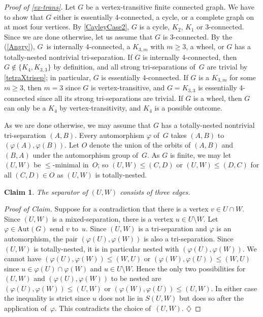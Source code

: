 \documentclass{aic}
\newcommand{\jaf}[3]{#2} %
\newenvironment{cproof}{\noindent\textit{Proof of Claim.}}{\phantom{!}\!\hfill$\diamondsuit$}
\theoremstyle{plain}
\newtheorem{sublem}{Claim}[thm]
\theoremstyle{definition}
\theoremstyle{plain}
\theoremstyle{plain}
\newcommand{\sm}{\setminus}
\renewcommand{\geq}{\geqslant}
\renewcommand{\le}{\leqslant}
\renewcommand{\ge}{\geqslant}
\begin{document}
\begin{proof}[Proof of \autoref{vx-trans}]
Let $G$ be a vertex-transitive finite connected graph.
We have to show that $G$ either is essentially 4-connected, a cycle, or a complete graph on at most four vertices.
By \jaf{\cite[Theorem~3]{infiniteSPQR}}{\autoref{CayleyCase2}}{\autoref{CayleyCase2}}, $G$ is a cycle, $K_2$, $K_1$ or 3-connected. 
Since we are done otherwise, let us assume that $G$ is 3-connected.
By the  (\ref{Angry}), $G$~is internally 4-connected, a $K_{3,m}$ with $m\geq 3$, a wheel, or $G$ has a totally-nested nontrivial tri-separation. 
If $G$ is internally 4-connected, then $G\notin \{K_4,K_{3,3}\}$ by definition, and all strong tri-separations of~$G$ are trivial by \autoref{tetraXtrisep}; in particular, $G$ is essentially 4-connected.
If $G$ is a $K_{3,m}$ for some~$m\ge 3$, then $m=3$ since $G$ is vertex-transitive, and $G=K_{3,3}$ is essentially 4-connected since all its strong tri-separations are trivial.
If $G$ is a wheel, then $G$ can only be a $K_4$ by vertex-transitivity, and $K_4$ is a possible outcome.

As we are done otherwise, we may assume that $G$ has a totally-nested nontrivial tri-separation $(A,B)$.
Every automorphism $\varphi$ of~$G$ takes $(A,B)$ to~$(\varphi(A),\varphi(B))$.
Let $O$ denote the union of the orbits of $(A,B)$ and $(B,A)$ under the automorphism group of~$G$.
As $G$ is finite, we may let $(U,W)$ be $\le$-minimal in~$O$; so $(U,W)\le (C,D)$ or $(U,W)\le (D,C)$ for all $(C,D)\in O$ as $(U,W)$ is totally-nested.

\begin{sublem}\label{Cayley:threeCut}
The separator of $(U,W)$ consists of three edges.
\end{sublem}
\begin{cproof}
Suppose for a contradiction that there is a vertex $v\in U\cap W$.
Since $(U,W)$ is a mixed-separation, there is a vertex $u\in U\sm W$.
Let $\varphi\in\text{Aut}(G)$ send $v$ to~$u$.
Since $(U,W)$ is a tri-separation and $\varphi$ is an automorphism, the pair $(\varphi(U),\varphi(W))$ is also a tri-separation.
Since $(U,W)$ is totally-nested, it is in particular nested with $(\varphi(U),\varphi(W))$.
We cannot have $(\varphi(U),\varphi(W))\le (W,U)$ or $(\varphi(W),\varphi(U))\le (W,U)$ since $u\in \varphi(U)\cap\varphi(W)$ and $u\in U\sm W$.
Hence the only two possibilities for $(U,W)$ and $(\varphi(U),\varphi(W))$ to be nested are $(\varphi(U),\varphi(W))\le (U,W)$ or $(\varphi(W),\varphi(U))\le (U,W)$.
In either case the inequality is strict since $u$ does not lie in $S(U,W)$ but does so after the application of~$\varphi$. This contradicts the choice of~$(U,W)$.
\end{cproof}\medskip


\end{proof}
\end{document}
